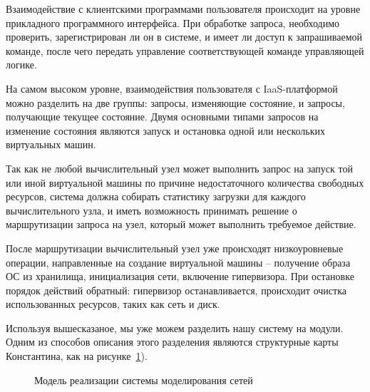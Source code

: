 Взаимодействие с клиентскими программами пользователя происходит на уровне прикладного 
программного интерфейса. При обработке запроса, необходимо проверить, зарегистрирован
ли он в системе, и имеет ли доступ к запрашиваемой команде, после чего передать управление
соответствующей команде управляющей логике.

На самом высоком уровне, взаимодействия пользователя с IaaS-платформой можно разделить на
две группы: запросы, изменяющие состояние, и запросы, получающие текущее состояние.
Двумя основными типами запросов на изменение состояния являются запуск и остановка
одной или нескольких виртуальных машин.

Так как не любой вычислительный узел может выполнить запрос на запуск той или иной
виртуальной машины по причине недостаточного количества свободных ресурсов,
система должна собирать статистику загрузки для каждого вычислительного узла,
и иметь возможность принимать решение о маршрутизации запроса на узел, который может 
выполнить требуемое действие.

После маршрутизации вычислительный узел уже происходят низкоуровневые операции, 
направленные на создание виртуальной машины -- получение образа ОС из хранилища, 
инициализация сети, включение гипервизора. 
При остановке порядок действий обратный: гипервизор останавливается, происходит 
очистка использованных ресурсов, таких как сеть и диск.

Используя вышесказаное, мы уже можем разделить нашу систему на модули. Одним из способов
описания этого разделения являются структурные карты Константина, как на рисунке~\ref{fig:iaas-lowlevel}).
\begin{figure}
  \centering
  {\footnotesize}
  \caption{Модель реализации системы моделирования сетей}
  \label{fig:iaas-lowlevel}
\end{figure} 


